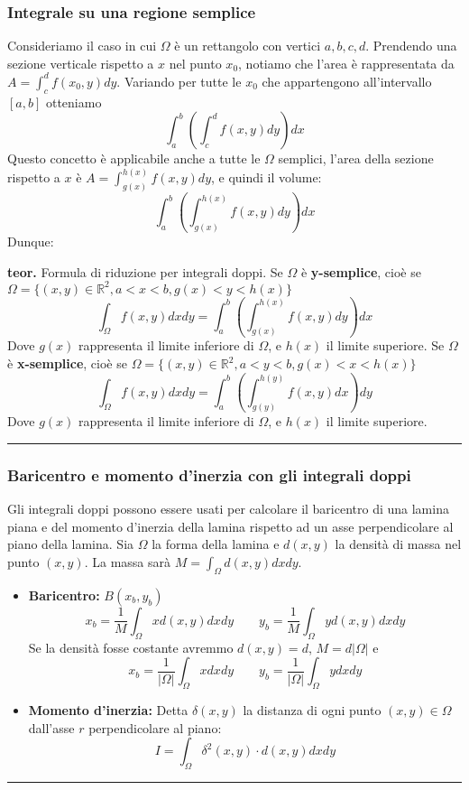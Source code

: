 \subsubsection*{Integrale su una regione semplice}
Consideriamo il caso in cui $\Omega$ è un rettangolo con vertici $a, b, c, d$.\newline
Prendendo una sezione verticale rispetto a $x$ nel punto $x_0$, notiamo che l'area è rappresentata da $A = \int_{c}^{d}f(x_0, y)dy$. Variando per tutte le $x_0$ che appartengono all'intervallo $[a,b]$ otteniamo
\[
    \int_{a}^{b} \left(\int_{c}^{d}f(x,y) dy \right)dx
\]
Questo concetto è applicabile anche a tutte le $\Omega$ semplici, l'area della sezione rispetto a $x$ è $A = \int_{g(x)}^{h(x)}f(x,y)dy$, e quindi il volume:
\[
    \int_{a}^{b}\left(\int_{g(x)}^{h(x)}f(x,y) dy \right)dx
\]
Dunque:\newline
\begin{tcolorbox}
\textbf{teor.} Formula di riduzione per integrali doppi.\newline
Se $\Omega$ è \textbf{y-semplice}, cioè se $\Omega = \{(x,y) \in \mathbb{R}^2, a< x<b, g(x)<y<h(x)\}$
\[
    \int_{\Omega}f(x,y)dxdy = \int_{a}^{b}\left(\int_{g(x)}^{h(x)}f(x,y)dy\right)dx
\]
Dove $g(x)$ rappresenta il limite inferiore di $\Omega$, e $h(x)$ il limite superiore.\newline
Se $\Omega$ è \textbf{x-semplice}, cioè se $\Omega = \{(x,y) \in \mathbb{R}^2, a< y<b, g(x)<x<h(x)\}$
\[
    \int_{\Omega}f(x,y)dxdy = \int_{a}^{b}\left(\int_{g(y)}^{h(y)}f(x,y)dx\right)dy
\]
Dove $g(x)$ rappresenta il limite inferiore di $\Omega$, e $h(x)$ il limite superiore.\newline
\end{tcolorbox}
\rule{\textwidth}{0,4pt}
\subsubsection*{Baricentro e momento d'inerzia con gli integrali doppi}
Gli integrali doppi possono essere usati per calcolare il baricentro di una lamina piana e del momento d'inerzia della lamina rispetto ad un asse perpendicolare al piano della lamina.\newline
Sia $\Omega$ la forma della lamina e $d(x,y)$ la densità di massa nel punto $(x,y)$. La massa sarà $M = \int_{\Omega}d(x,y) dxdy$.
\begin{itemize}
    \item \textbf{Baricentro:} $B(x_b, y_b)$
    \[
        x_b = \frac{1}{M}\int_\Omega x d(x,y) dx dy \quad \quad y_b =\frac{1}{M}\int_\Omega y d(x,y) dxdy 
    \]
    Se la densità fosse costante avremmo $d(x,y) = d$, $M = d |\Omega|$ e
    \[
        x_b = \frac{1}{|\Omega|}\int_\Omega x dx dy \quad \quad y_b =\frac{1}{|\Omega|}\int_\Omega y dxdy
    \]
    \item \textbf{Momento d'inerzia:}\newline
    Detta $\delta(x,y)$ la distanza di ogni punto $(x,y) \in \Omega$ dall'asse $r$ perpendicolare al piano:
    \[
        I = \int_\Omega \delta^2(x,y) \cdot  d(x,y) dxdy
    \]
\end{itemize}
\rule{\textwidth}{0,4pt}
